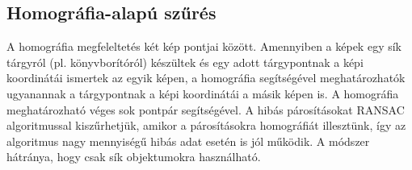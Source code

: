 	\subsection{Homográfia-alapú szűrés}
	\label{match-homogr}
	A homográfia megfeleltetés két kép pontjai között. Amennyiben a képek egy sík tárgyról (pl. könyvborítóról) készültek és egy adott tárgypontnak a képi koordinátái ismertek az egyik képen, a homográfia segítségével meghatározhatók ugyanannak a tárgypontnak a képi koordinátái a másik képen is. 
	A homográfia meghatározható véges sok pontpár segítségével. A hibás párosításokat RANSAC algoritmussal kiszűrhetjük, amikor a párosításokra homográfiát illesztünk, így az algoritmus nagy mennyiségű hibás adat esetén is jól működik.
	A módszer hátránya, hogy csak sík objektumokra használható.